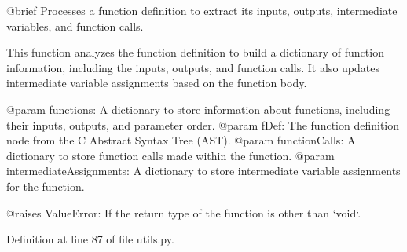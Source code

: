 \begin{DoxyVerb}@brief Processes a function definition to extract its inputs, outputs, intermediate variables, and function calls.

This function analyzes the function definition to build a dictionary of function information, including
the inputs, outputs, and function calls. It also updates intermediate variable assignments based on the function body.

@param functions: A dictionary to store information about functions, including their inputs, outputs, and parameter order.
@param fDef: The function definition node from the C Abstract Syntax Tree (AST).
@param functionCalls: A dictionary to store function calls made within the function.
@param intermediateAssignments: A dictionary to store intermediate variable assignments for the function.

@raises ValueError: If the return type of the function is other than `void`.
\end{DoxyVerb}
 

Definition at line 87 of file utils.\+py.


